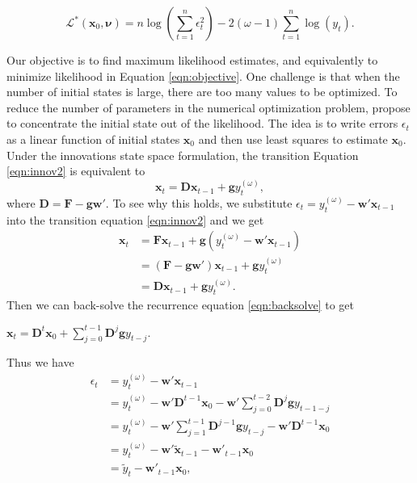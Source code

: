 \documentclass{uwstat572}
\begin{document}
\begin{equation}
\mathcal{L}^{*}(\textbf{x}_0, \bm{\nu})=n \log (\sum\limits_{t=1}^n \epsilon_t^2)-2(\omega-1) \sum\limits_{t=1}^n \log(y_t).
\label{eqn:objective}
\end{equation}

Our objective is to find maximum likelihood estimates, and equivalently to minimize likelihood in Equation \ref{eqn:objective}. One challenge is that when the number of initial states is large, there are too many values to be optimized. To reduce the number of parameters in the numerical optimization problem, \citet{de2011forecasting} propose to concentrate the initial state out of the likelihood. The idea is to write errors $\epsilon_t$ as a linear function of initial states $\textbf{x}_0$ and then use least squares to estimate $\textbf{x}_0$. Under the innovations state space formulation, the transition Equation \ref{eqn:innov2} is equivalent to 
\begin{equation}
\textbf{x}_t=\textbf{D}\textbf{x}_{t-1}+\textbf{g}y_t^{(\omega)}, \label{eqn:backsolve}
\end{equation}
where $\textbf{D}=\textbf{F}-\textbf{g} \textbf{w}'$. To see why this holds, we substitute $\displaystyle  \epsilon_t=y_t^{(\omega)}-\textbf{w}'\textbf{x}_{t-1}$ into the transition equation \ref{eqn:innov2} and we get
\begin{align*}
\textbf{x}_t&= \textbf{F}\textbf{x}_{t-1}+\textbf{g}(y_t^{(\omega)}-\textbf{w}'\textbf{x}_{t-1}) \\
&= (\textbf{F}-\textbf{g} \textbf{w}') \textbf{x}_{t-1} +\textbf{g} y_t^{(\omega)} \\
&= \textbf{D} \textbf{x}_{t-1} +\textbf{g}y_t^{(\omega)}  .
\end{align*}
Then we can back-solve the recurrence equation \ref{eqn:backsolve} to get 
\begin{center}
$\textbf{x}_t=\textbf{D}^t \textbf{x}_0+\sum\limits_{j=0}^{t-1} \textbf{D}^j \textbf{g} y_{t-j}$.
\end{center}
Thus we have 
\begin{align*}
\epsilon_t &= y_t^{(\omega)}-\textbf{w}'\textbf{x}_{t-1} \\
&= y_t^{(\omega)}-\textbf{w}'\textbf{D}^{t-1} \textbf{x}_0-\textbf{w}' \sum\limits_{j=0}^{t-2} \textbf{D}^j \textbf{g} y_{t-1-j} \\
&=  y_t^{(\omega)}-\textbf{w}' \sum\limits_{j=1}^{t-1} \textbf{D}^{j -1}\textbf{g} y_{t-j} -\textbf{w}' \textbf{D}^{t-1} \textbf{x}_0\\
&=  y_t^{(\omega)}- \textbf{w}' \tilde{\textbf{x}}_{t-1}-\textbf{w}'_{t-1}\textbf{x}_0 \\
&= \tilde{y}_t -\textbf{w}'_{t-1}\textbf{x}_0,
\end{align*}
\end{document}
